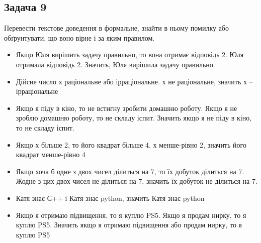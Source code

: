 \documentclass{article}
\begin{document}
\subsection*{Задача 9}
Перевести текстове доведення в формальне, знайти в ньому помилку або обґрунтувати, що воно вірне і за яким правилом.
\begin{itemize}
    \item Якщо Юля вирішить задачу правильно, то вона отримає відповідь 2. Юля отримала відповідь 2. Значить, Юля вирішила задачу правильно.
    \item Дійсне число х раціональне або ірраціональне. х не раціональне, значить х -- ірраціональне
    \item Якщо я піду в кіно, то не встигну зробити домашню роботу. Якщо я не зроблю домашню роботу, то не складу іспит.
Значить якщо я не піду в кіно, то не складу іспит.
    \item Якщо х більше 2, то його квадрат більше 4. х менше-рівно 2, значить його квадрат менше-рівно 4
    \item Якщо хоча б одне з двох чисел ділиться на 7, то їх добуток ділиться на 7.
Жодне з цих двох чисел не ділиться на 7, значить їх добуток не ділиться на 7.
    \item Катя знає С++ і Катя знає python, значить Катя знає python
    \item Якщо я отримаю підвищення, то я куплю PS5. Якщо я продам нирку, то я куплю PS5.
Значить якщо я отримаю підвищення або продам нирку, то я куплю PS5
\end{itemize}
\end{document}
